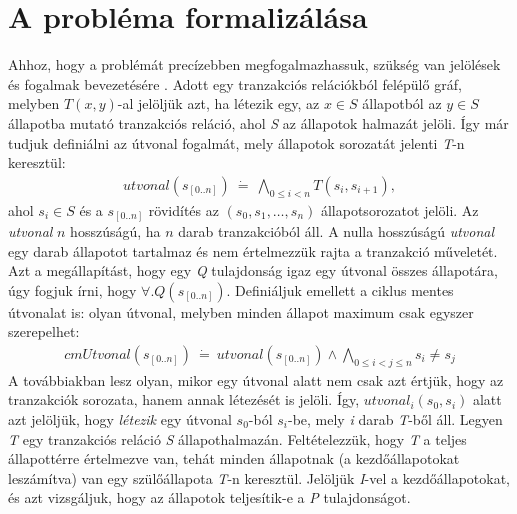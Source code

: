 \section{A probléma formalizálása}
\label{sec:problema_form}

Ahhoz, hogy a problémát precízebben megfogalmazhassuk, szükség van jelölések és fogalmak bevezetésére \cite{k_induction_article}. Adott egy tranzakciós relációkból felépülő gráf, melyben $T(x, y)$-al jelöljük azt, ha létezik egy, az $x \in S$ állapotból az $y \in S$ állapotba mutató tranzakciós reláció, ahol \emph{S} az állapotok halmazát jelöli. Így már tudjuk definiálni az útvonal fogalmát, mely állapotok sorozatát jelenti \emph{T}-n keresztül:
\begin{align}
	\label{eq:relacio_sor}
	\mathit{utvonal}(s_{[0..n]})~\dot{=}~\bigwedge_{0 \leq i < n} T(s_{i}, s_{i+1}),
\end{align}
ahol $s_i \in S$ és a $s_{[0..n]}$ rövidítés az $(s_{0}, s_{1}, \dots, s_{n})$ állapotsorozatot jelöli. Az \emph{utvonal} $n$ hosszúságú, ha $n$ darab tranzakcióból áll. A nulla hosszúságú \emph{utvonal} egy darab állapotot tartalmaz és nem értelmezzük rajta a tranzakció műveletét. Azt a megállapítást, hogy egy \emph{Q} tulajdonság igaz egy útvonal összes állapotára, úgy fogjuk írni, hogy $\forall . Q(s_{[0..n]})$.
\newline
\newline
Definiáljuk emellett a ciklus mentes útvonalat is: olyan útvonal, melyben minden állapot maximum csak egyszer szerepelhet:
\begin{align}
	\mathit{cmUtvonal}(s_{[0..n]})~\dot{=}~\mathit{utvonal}(s_{[0..n]}) \wedge \bigwedge_{0 \leq i < j \leq n} s_{i} \neq s_{j}
\end{align}
A továbbiakban lesz olyan, mikor egy útvonal alatt nem csak azt értjük, hogy az tranzakciók sorozata, hanem annak létezését is jelöli. Így, $\mathit{utvonal}_{i}(s_{0}, s_{i})$ alatt azt jelöljük, hogy \emph{létezik} egy útvonal $s_{0}$-ból $s_{i}$-be, mely \emph{i} darab \emph{T}-ből áll.
\newline
\newline
Legyen \emph{T} egy tranzakciós reláció \emph{S} állapothalmazán. Feltételezzük, hogy \emph{T} a teljes állapottérre értelmezve van, tehát minden állapotnak (a kezdőállapotokat leszámítva) van egy szülőállapota \emph{T}-n keresztül. Jelöljük \emph{I}-vel a kezdőállapotokat, és azt vizsgáljuk, hogy az állapotok teljesítik-e a \emph{P} tulajdonságot.


